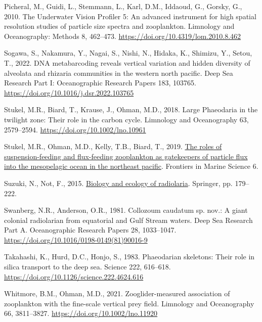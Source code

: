 \documentclass[
]{article}
\newlength{\cslhangindent}
\newlength{\cslentryspacingunit} %
\newenvironment{CSLReferences}[2] %
 {%
  \setlength{\parindent}{0pt}
  \ifodd #1
  \let\oldpar\par
  \def\par{\hangindent=\cslhangindent\oldpar}
  \fi
  \setlength{\parskip}{#2\cslentryspacingunit}
 }%
 {}
\begin{document}
\begin{CSLReferences}{1}{0}
\leavevmode{}%
Picheral, M., Guidi, L., Stemmann, L., Karl, D.M., Iddaoud, G., Gorsky,
G., 2010. The Underwater Vision Profiler 5: An advanced instrument for
high spatial resolution studies of particle size spectra and
zooplankton. Limnology and Oceanography: Methods 8, 462--473.
\url{https://doi.org/10.4319/lom.2010.8.462}

\leavevmode{}%
Sogawa, S., Nakamura, Y., Nagai, S., Nishi, N., Hidaka, K., Shimizu, Y.,
Setou, T., 2022. DNA metabarcoding reveals vertical variation and hidden
diversity of alveolata and rhizaria communities in the western north
pacific. Deep Sea Research Part I: Oceanographic Research Papers 183,
103765. \url{https://doi.org/10.1016/j.dsr.2022.103765}

\leavevmode{}%
Stukel, M.R., Biard, T., Krause, J., Ohman, M.D., 2018. Large Phaeodaria
in the twilight zone: Their role in the carbon cycle. Limnology and
Oceanography 63, 2579--2594. \url{https://doi.org/10.1002/lno.10961}

\leavevmode{}%
Stukel, M.R., Ohman, M.D., Kelly, T.B., Biard, T., 2019.
\href{https://www.frontiersin.org/articles/10.3389/fmars.2019.00397}{The
roles of suspension-feeding and flux-feeding zooplankton as gatekeepers
of particle flux into the mesopelagic ocean in the northeast pacific}.
Frontiers in Marine Science 6.

\leavevmode{}%
Suzuki, N., Not, F., 2015.
\href{https://link.springer.com/chapter/10.1007/978-4-431-55130-0_8}{Biology
and ecology of radiolaria}. Springer, pp. 179--222.

\leavevmode{}%
Swanberg, N.R., Anderson, O.R., 1981. Collozoum caudatum sp. nov.: A
giant colonial radiolarian from equatorial and Gulf Stream waters. Deep
Sea Research Part A. Oceanographic Research Papers 28, 1033--1047.
\url{https://doi.org/10.1016/0198-0149(81)90016-9}

\leavevmode{}%
Takahashi, K., Hurd, D.C., Honjo, S., 1983. Phaeodarian skeletons: Their
role in silica transport to the deep sea. Science 222, 616--618.
\url{https://doi.org/10.1126/science.222.4624.616}

\leavevmode{}%
Whitmore, B.M., Ohman, M.D., 2021. Zooglider-measured association of
zooplankton with the fine-scale vertical prey field. Limnology and
Oceanography 66, 3811--3827. \url{https://doi.org/10.1002/lno.11920}


\end{CSLReferences}
\end{document}
